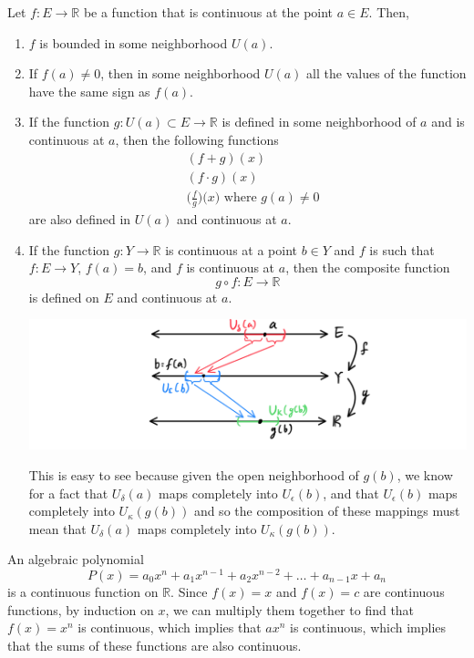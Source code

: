 \documentclass{article}
\begin{document}
    \begin{theorem}
    Let $f: E \longrightarrow \mathbb{R}$ be a function that is continuous at the point $a \in E$. Then, 
    \begin{enumerate}
      \item $f$ is bounded in some neighborhood $U(a)$. 
      \item If $f(a) \neq 0$, then in some neighborhood $U(a)$ all the values of the function have the same sign as $f(a)$. 
      \item If the function $g: U(a) \subset E \longrightarrow \mathbb{R}$ is defined in some neighborhood of $a$ and is continuous at $a$, then the following functions 
      \begin{align*}
          & (f + g) (x) \\
          & (f \cdot g) (x) \\
          & \bigg( \frac{f}{g} \bigg) \big( x \big) \text{ where } g(a) \neq 0
      \end{align*}
      are also defined in $U(a)$ and continuous at $a$. 
      \item If the function $g: Y \longrightarrow \mathbb{R}$ is continuous at a point $b \in Y$ and $f$ is such that $f: E \longrightarrow Y$, $f(a) = b$, and $f$ is continuous at $a$, then the composite function 
      \[g \circ f: E \longrightarrow \mathbb{R}\]
      is defined on $E$ and continuous at $a$. 
      \begin{center}
          \includegraphics[scale=0.25]{img/Composition_Function_Continuous.PNG}
      \end{center}
      This is easy to see because given the open neighborhood of $g(b)$, we know for a fact that $U_\delta (a)$ maps completely into $U_\epsilon (b)$, and that $U_\epsilon (b)$ maps completely into $U_\kappa (g(b))$ and so the composition of these mappings must mean that $U_\delta (a)$ maps completely into $U_\kappa (g(b))$. 
    \end{enumerate}
    \end{theorem}

    \begin{example}
      An algebraic polynomial 
      \[P(x) = a_0 x^n + a_1 x^{n-1} + a_2 x^{n-2} + \ldots + a_{n-1} x + a_n\]
      is a continuous function on $\mathbb{R}$. Since $f(x) = x$ and $f(x) = c$ are continuous functions, by induction on $x$, we can multiply them together to find that $f(x) = x^n$ is continuous, which implies that $a x^n$ is continuous, which implies that the sums of these functions are also continuous. 
    \end{example}
\end{document}
